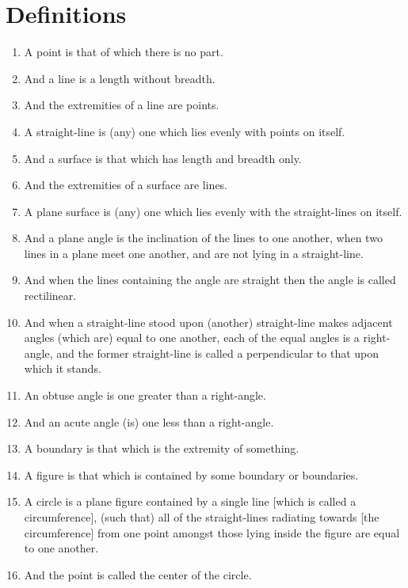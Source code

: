 \chapter{Definitions}

\begin{enumerate}
    \item \label{def:1} A point is that of which there is no part.
    \item \label{def:2} And a line is a length without breadth.
    \item \label{def:3} And the extremities of a line are points.
    \item \label{def:4} A straight-line is (any) one which lies evenly with points on itself.
    \item \label{def:5} And a surface is that which has length and breadth only.
    \item \label{def:6} And the extremities of a surface are lines.
    \item \label{def:7} A plane surface is (any) one which lies evenly with the straight-lines on itself.
    \item \label{def:8} And a plane angle is the inclination of the lines to one another, when two lines in a plane meet one another, and are not lying in a straight-line.
    \item \label{def:9} And when the lines containing the angle are straight then the angle is called rectilinear.
    \item \label{def:10} And when a straight-line stood upon (another) straight-line makes adjacent angles (which are) equal to one another, each of the equal angles is a right-angle, and the former straight-line is called a perpendicular to that upon which it stands.
    \item \label{def:11} An obtuse angle is one greater than a right-angle.
    \item \label{def:12} And an acute angle (is) one less than a right-angle.
    \item \label{def:13} A boundary is that which is the extremity of something.
    \item \label{def:14} A figure is that which is contained by some boundary or boundaries.
    \item \label{def:15} A circle is a plane figure contained by a single line [which is called a circumference], (such that) all of the straight-lines radiating towards [the circumference] from one point amongst those lying inside the figure are equal to one another.
    \item \label{def:16} And the point is called the center of the circle.

\end{enumerate}
